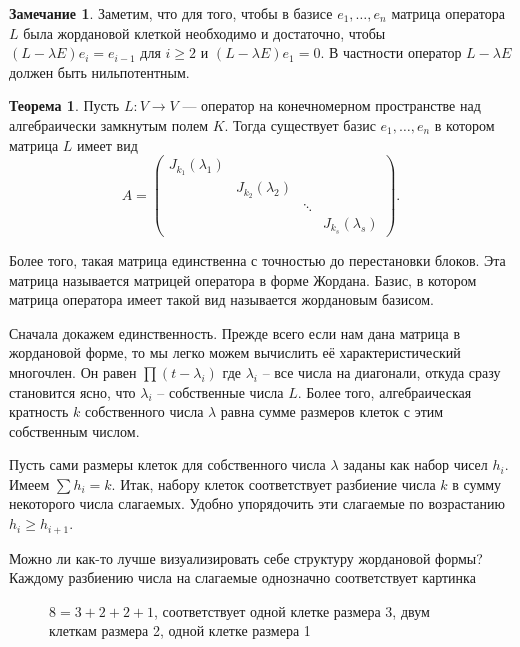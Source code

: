 \documentclass[10pt,a4paper,oneside]{book} %
\theoremstyle{definition}
\newtheorem*{rem}{Замечание}
\newtheorem{thm}{Теорема}
\def\thrm{\begin{thm}}
\def\ethrm{\end{thm}}
\def\rm{\begin{rem}}
\def\erm{\end{rem}}
\begin{document}
\rm Заметим, что для того, чтобы в базисе $e_1,\dots,e_n$ матрица оператора $L$ была жордановой клеткой необходимо и достаточно, чтобы $(L-\lambda E)e_i=e_{i-1}$ для $i\geq 2$ и $(L-\lambda E)e_1=0$. В частности оператор $L-\lambda E$ должен быть нильпотентным.
\erm







\thrm Пусть $L\colon V \to V$ --- оператор на конечномерном пространстве над алгебраически замкнутым полем $K$.
Тогда существует базис $e_1,\dots, e_n$ в котором матрица $L$ имеет вид
$$A=\begin{pmatrix}
J_{k_1}(\lambda_1) &&&\\
& J_{k_2}(\lambda_2) &&\\
&& \ddots& \\
&&& J_{k_s}(\lambda_s)

\end{pmatrix}.
$$

Более того, такая матрица единственна с точностью до перестановки блоков. Эта матрица называется матрицей оператора в форме Жордана. Базис, в котором матрица оператора имеет такой вид называется жордановым базисом.
\ethrm
\proof

Сначала докажем единственность. Прежде всего если нам дана матрица в жордановой форме, то мы легко можем вычислить её характеристический многочлен. Он равен $\prod (t-\lambda_i)$ где $\lambda_i$ -- все числа на диагонали, откуда сразу становится ясно, что $\lambda_i$ -- собственные числа $L$. Более того, алгебраическая кратность
$k$ собственного числа $\lambda$ равна сумме размеров клеток с этим собственным числом.

Пусть сами размеры клеток для собственного числа $\lambda$ заданы как набор чисел $h_i$. Имеем
$\sum h_i =k.$
Итак, набору клеток соответствует разбиение числа $k$ в сумму некоторого числа слагаемых. Удобно упорядочить эти слагаемые по возрастанию $h_i\geq h_{i+1}$.

Можно ли как-то лучше визуализировать себе структуру жордановой формы?
Каждому разбиению числа на слагаемые однозначно соответствует картинка


\begin{figure}[hhh]
\begin{center}
\end{center}
\caption{$8=3+2+2+1$, соответствует одной клетке размера 3, двум клеткам размера 2, одной клетке размера 1}
\end{figure}
\end{document}
